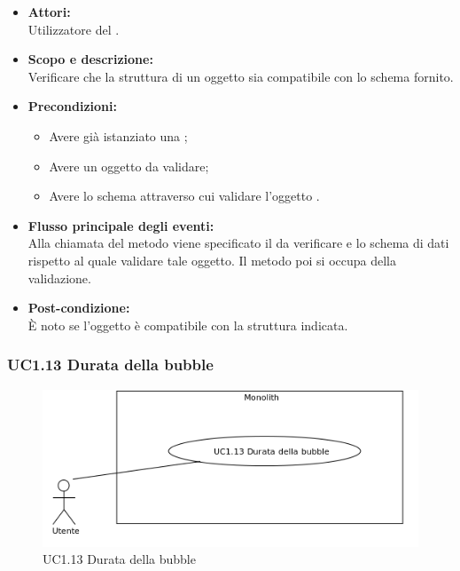 \begin{itemize}
	\item \textbf{Attori:}
	\\Utilizzatore del .
	\item \textbf{Scopo e descrizione:} 
	\\Verificare che la struttura di un oggetto  sia compatibile con lo schema fornito.
	\item \textbf{Precondizioni:}
	\begin{itemize}
		\item Avere già istanziato una ;
		\item Avere un oggetto  da validare;
		\item Avere lo schema attraverso cui validare l'oggetto .
	\end{itemize}
	\item \textbf{Flusso principale degli eventi:}
	\\Alla chiamata del metodo viene specificato il  da verificare e lo schema di dati rispetto al quale validare tale oggetto. Il metodo poi si occupa della validazione.
	\item \textbf{Post-condizione:}
	\\È noto se l'oggetto  è compatibile con la struttura indicata.
\end{itemize}

\subsubsection{UC1.13 Durata della bubble} \label{UC1.13}

\begin{figure}[H]
	\centering
	\includegraphics[width=15cm]{../../documenti/AnalisiDeiRequisiti/Diagrammi_img/uc1_13.png}
	\caption{UC1.13 Durata della bubble}
\end{figure}

